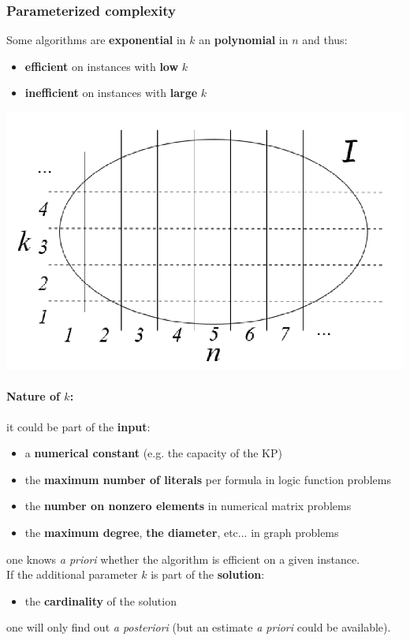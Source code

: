 \documentclass[11pt]{article}
\begin{document}
	\subsubsection{Parameterized complexity}
	Some algorithms are \textbf{exponential} in $k$ an \textbf{polynomial} in $n$ and thus: 
	\begin{itemize}
		\item \textbf{efficient} on instances with \textbf{low} $k$
		\item \textbf{inefficient} on instances with \textbf{large} $k$
	\end{itemize}
	\begin{center}
		\includegraphics[width=0.5\columnwidth]{img/PC1}
	\end{center}
	
	\newpage
	
	\paragraph{Nature of $k$:} it could be part of the \textbf{input}: 
	\begin{itemize}
		\item a \textbf{numerical constant} (e.g. the capacity of the KP)
		\item the \textbf{maximum number of literals} per formula in logic function problems
		\item the \textbf{number on nonzero elements} in numerical matrix problems
		\item the \textbf{maximum degree}, \textbf{the diameter}, etc... in graph problems
	\end{itemize}
	one knows \textit{a priori} whether the algorithm is efficient on a given instance.\\
	
	If the additional parameter $k$ is part of the \textbf{solution}: 
	\begin{itemize}
		\item the \textbf{cardinality} of the solution
	\end{itemize}
	one will only find out \textit{a posteriori} (but an estimate \textit{a priori} could be available).\\
	
\end{document}
